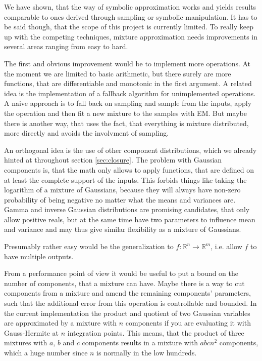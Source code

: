 \documentclass[11pt,a4paper]{book}
\begin{document}
We have shown, that the way of symbolic approximation works and yields results
comparable to ones derived through sampling or symbolic manipulation. It has to
be said though, that the scope of this project is currently limited. To really
keep up with the competing techniques, mixture approximation needs improvements
in several areas ranging from easy to hard.

The first and obvious improvement would be to implement more operations. At the
moment we are limited to basic arithmetic, but there surely are more functions,
that are differentiable and monotonic in the first argument. A related idea is
the implementation of a fallback algorithm for unimplemented operations. A naive
approach is to fall back on sampling and sample from the inputs, apply the
operation and then fit a new mixture to the samples with EM. But maybe there is
another way, that uses the fact, that everything is mixture distributed, more
directly and avoids the involvment of sampling.

An orthogonal idea is the use of other component distributions, which we already
hinted at throughout section \ref{sec:closure}. The problem with Gaussian
components is, that the math only allows to apply functions, that are defined on
at least the complete support of the inputs. This forbids things like taking the
logarithm of a mixture of Gaussians, because they will always have non-zero
probability of being negative no matter what the means and variances are. Gamma
and inverse Gaussian distributions are promising candidates, that only allow
positive reals, but at the same time have two parameters to influence mean and
variance and may thus give similar flexibility as a mixture of Gaussians.

Presumably rather easy would be the generalization to
$f : \mathbb{R}^{n} \rightarrow \mathbb{R}^{m}$, i.e. allow $f$ to have multiple
outputs.

From a performance point of view it would be useful to put a bound on the number
of components, that a mixture can have. Maybe there is a way to cut components
from a mixture and amend the remaining components' parameters, such that the
additional error from this operation is controllable and bounded. In the current
implementation the product and quotient of two Gaussian variables are
approximated by a mixture with $n$ components if you are evaluating it with
Gauss-Hermite at $n$ integration points. This means, that the product of three
mixtures with $a$, $b$ and $c$ components results in a mixture with $abcn^{2}$
components, which a huge number since $n$ is normally in the low hundreds.
\end{document}
